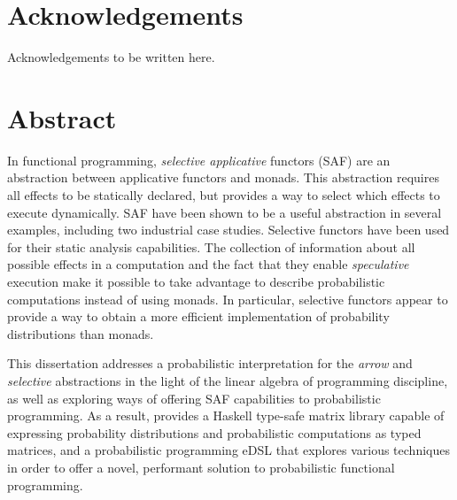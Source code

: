 \documentclass[
  oneside,
  11pt, a4paper,
  footinclude=true,
  headinclude=true,
  cleardoublepage=empty
]{scrbook}
\author{Armando João Isaías Ferreira dos Santos}
\date{\myear} %
\theoremstyle{definition}
\theoremstyle{definition}
\begin{document}
	\umfrontcover	
	\umtitlepage
	
	\chapter*{Acknowledgements}
	Acknowledgements to be written here. %


	\chapter*{Abstract}

    
    In functional programming, \emph{selective applicative} functors (SAF) are an abstraction between applicative functors and monads. This abstraction requires all effects to be statically declared, but provides a way to select which effects to execute dynamically. SAF have been shown to be a useful abstraction in several examples, including two industrial case studies. Selective functors have been used for their static analysis capabilities. The collection of information about all possible effects in a computation and the fact that they enable \emph{speculative} execution make it possible to take advantage to describe probabilistic computations instead of using monads. In particular, selective functors appear to provide a way to obtain a more efficient implementation of probability distributions than monads.
    
    This dissertation addresses a probabilistic interpretation for the \emph{arrow} and \emph{selective} abstractions in the light of the linear algebra of programming discipline, as well as exploring ways of offering SAF capabilities to probabilistic programming. As a result, provides a Haskell type-safe matrix library capable of expressing probability distributions and probabilistic computations as typed matrices, and a probabilistic programming eDSL that explores various techniques in order to offer a novel, performant solution to probabilistic functional programming.
	
	\vskip0.5cm
	
\end{document}
